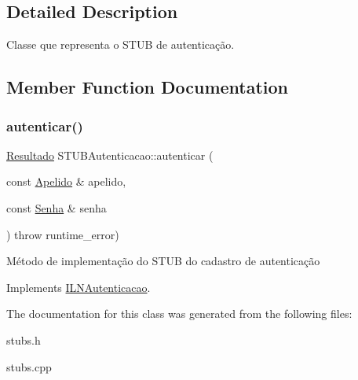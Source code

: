 \subsection{Detailed Description}
Classe que representa o S\+T\+UB de autenticação. 

\subsection{Member Function Documentation}
\mbox{\label{classSTUBAutenticacao_a4b86dce88ab27b7b8d3fda491690bb18}} 
\subsubsection{\texorpdfstring{autenticar()}{autenticar()}}
{\footnotesize\ttfamily \hyperlink{classResultado}{Resultado} S\+T\+U\+B\+Autenticacao\+::autenticar (\begin{DoxyParamCaption}\item[{const \hyperlink{classApelido}{Apelido} \&}]{apelido,  }\item[{const \hyperlink{classSenha}{Senha} \&}]{senha }\end{DoxyParamCaption}) throw  runtime\+\_\+error) \hspace{0.3cm}{\ttfamily [virtual]}}

Método de implementação do S\+T\+UB do cadastro de autenticação 

Implements \hyperlink{classILNAutenticacao}{I\+L\+N\+Autenticacao}.



The documentation for this class was generated from the following files\+:\begin{DoxyCompactItemize}
\item 
stubs.\+h\item 
stubs.\+cpp\end{DoxyCompactItemize}
